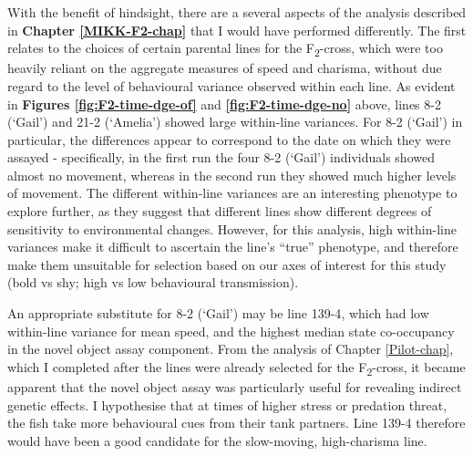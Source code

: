 \documentclass[
]{book}
\begin{document}
With the benefit of hindsight, there are a several aspects of the analysis described in \textbf{Chapter \ref{MIKK-F2-chap}} that I would have performed differently. The first relates to the choices of certain parental lines for the F\textsubscript{2}-cross, which were too heavily reliant on the aggregate measures of speed and charisma, without due regard to the level of behavioural variance observed within each line. As evident in \textbf{Figures \ref{fig:F2-time-dge-of}} and \textbf{\ref{fig:F2-time-dge-no}} above, lines \textcolor{8-2 (‘Gail’)_FF699C}{8-2 (‘Gail’)} and \textcolor{21-2 (‘Amelia’)_49B500}{21-2 (‘Amelia’)} showed large within-line variances. For \textcolor{8-2 (‘Gail’)_FF699C}{8-2 (‘Gail’)} in particular, the differences appear to correspond to the date on which they were assayed - specifically, in the first run the four \textcolor{8-2 (‘Gail’)_FF699C}{8-2 (‘Gail’)} individuals showed almost no movement, whereas in the second run they showed much higher levels of movement. The different within-line variances are an interesting phenotype to explore further, as they suggest that different lines show different degrees of sensitivity to environmental changes. However, for this analysis, high within-line variances make it difficult to ascertain the line's ``true'' phenotype, and therefore make them unsuitable for selection based on our axes of interest for this study (bold vs shy; high vs low behavioural transmission).

An appropriate substitute for \textcolor{8-2 (‘Gail’)_FF699C}{8-2 (‘Gail’)} may be line \textcolor{139-4_FF61CC}{139-4}, which had low within-line variance for mean speed, and the highest median state co-occupancy in the novel object assay component. From the analysis of Chapter \ref{Pilot-chap}, which I completed after the lines were already selected for the F\textsubscript{2}-cross, it became apparent that the novel object assay was particularly useful for revealing indirect genetic effects. I hypothesise that at times of higher stress or predation threat, the fish take more behavioural cues from their tank partners. Line \textcolor{139-4_FF61CC}{139-4} therefore would have been a good candidate for the slow-moving, high-charisma line.
\end{document}
